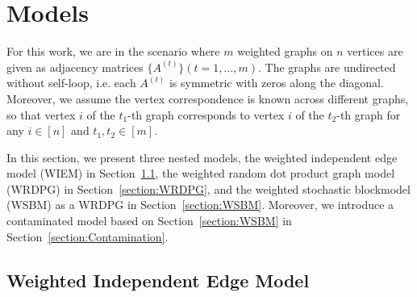 \documentclass[a4paper]{article}
\begin{document}

\section{Models}
\label{section:model}

For this work, we are in the scenario where $m$ weighted graphs on $n$ vertices are given as adjacency matrices $\{ A^{(t)} \} (t = 1, \dotsc, m)$. The graphs are undirected without self-loop, i.e. each $A^{(t)}$ is symmetric with zeros along the diagonal. Moreover, we assume the vertex correspondence is known across different graphs, so that vertex $i$ of the $t_1$-th graph corresponds to vertex $i$ of the $t_2$-th graph for any $i \in [n]$ and $t_1, t_2 \in [m]$.

In this section, we present three nested models, the weighted independent edge model (WIEM) in Section~\ref{section:WIEM}, the weighted random dot product graph model (WRDPG) in Section~\ref{section:WRDPG}, and the weighted stochastic blockmodel (WSBM) as a WRDPG in Section~\ref{section:WSBM}. Moreover, we introduce a contaminated model based on Section~\ref{section:WSBM} in Section~\ref{section:Contamination}.

\subsection{Weighted Independent Edge Model}
\label{section:WIEM}
\end{document}
